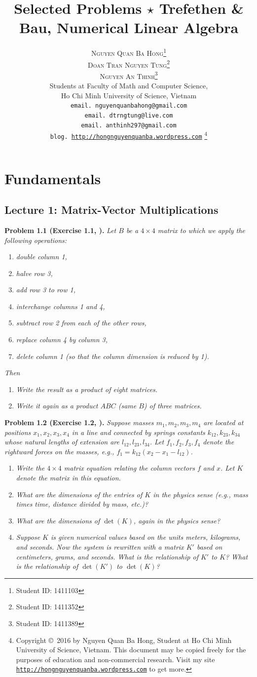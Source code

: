 \documentclass[a4paper,oneside]{book}
\title{\Huge Selected Problems $\star$ Trefethen \& Bau, Numerical Linear Algebra}
\author{\textsc{Nguyen Quan Ba Hong}\footnote{Student ID: 1411103}\\
\textsc{Doan Tran Nguyen Tung}\footnote{Student ID: 1411352}\\
\textsc{Nguyen An Thinh}\footnote{Student ID: 1411389}\\
{\small Students at Faculty of Math and Computer Science,}\\ 
{\small Ho Chi Minh University of Science, Vietnam} \\
{\small \texttt{email. nguyenquanbahong@gmail.com}}\\
{\small \texttt{email. dtrngtung@live.com}}\\
{\small \texttt{email. anthinh297@gmail.com}}\\
{\small \texttt{blog. \url{http://hongnguyenquanba.wordpress.com}} 
\footnote{Copyright \copyright\ 2016 by Nguyen Quan Ba Hong, Student at Ho Chi Minh University of Science, Vietnam. This document may be copied freely for the purposes of education and non-commercial research. Visit my site \texttt{\url{http://hongnguyenquanba.wordpress.com}} to get more.}}}
\numberwithin{equation}{chapter}
\begin{document}
\maketitle
\tableofcontents
\listoffigures
\chapter{Fundamentals}
\section{Lecture 1: Matrix-Vector Multiplications}
\textbf{Problem 1.1 (Exercise 1.1, \cite{1}).} \textit{Let $B$ be a $4\times 4$ matrix to which we apply the following operations:}
\begin{enumerate}
\item \textit{double column 1,}
\item \textit{halve row 3,}
\item \textit{add row 3 to row 1,}
\item \textit{interchange columns 1 and 4,}
\item \textit{subtract row 2 from each of the other rows,}
\item \textit{replace column 4 by column 3,}
\item \textit{delete column 1 (so that the column dimension is reduced by 1).}
\end{enumerate}
\textit{Then}
\begin{enumerate}
\item \textit{Write the result as a product of eight matrices.}
\item \textit{Write it again as a product $ABC$ (same $B$) of three matrices.}
\end{enumerate}
\textbf{Problem 1.2 (Exercise 1.2, \cite{1}).} \textit{Suppose masses $m_1,m_2,m_3,m_4$ are located at positions $x_1,x_2,x_3,x_4$ in a line and connected by springs constants $k_{12},k_{23},k_{34}$ whose natural lengths of extension are $l_{12},l_{23},l_{34}$. Let $f_1,f_2,f_3,f_4$ denote the rightward forces on the masses, e.g., ${f_1} = {k_{12}}\left( {{x_2} - {x_1} - {l_{12}}} \right)$.}
\begin{enumerate}
\item \textit{Write the $4\times 4$ matrix equation relating the column vectors $f$ and $x$. Let $K$ denote the matrix in this equation.}
\item \textit{What are the dimensions of the entries of $K$ in the physics sense (e.g., mass times time, distance divided by mass, etc.)?}
\item \textit{What are the dimensions of $\det\left(K\right)$, again in the physics sense?}
\item \textit{Suppose $K$ is given numerical values based on the units meters, kilograms, and seconds. Now the system is rewritten with a matrix $K'$ based on centimeters, grams, and seconds. What is the relationship of $K'$ to $K$? What is the relationship of $\det \left(K'\right)$ to $\det\left(K\right)$?}
\end{enumerate}
\end{document}
